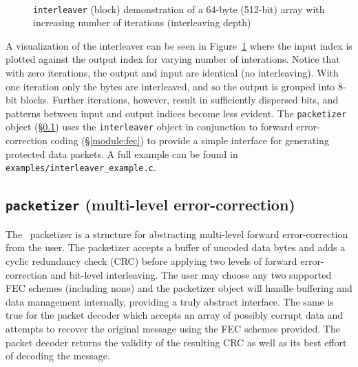 \begin{figure}
\centering
\mbox{
   \quad
   \quad
}
\mbox{
   \quad
   \quad
}
\mbox{
   \quad
}
\caption{{\tt interleaver} (block) demonstration of a 64-byte (512-bit) array
with increasing number of iterations (interleaving depth)}
\label{fig:module:framing:interleaver:scatterplot}
\end{figure}
%
A visualization of the interleaver can be seen in
Figure~\ref{fig:module:framing:interleaver:scatterplot}
where the input index is plotted against the output index for varying number
of interations.
Notice that with zero iterations, the output and input are identical (no
interleaving).
With one iteration only the bytes are interleaved, and so the output is
grouped into 8-bit blocks.
Further iterations, however, result in sufficiently dispersed bits, and
patterns between input and output indices become less evident.
%
The {\tt packetizer} object (\S\ref{module:framing:packetizer}) uses the
{\tt interleaver} object in conjunction to forward error-correction coding
(\S\ref{module:fec}) to provide a simple interface for generating
protected data packets.
A full example can be found in {\tt examples/interleaver\_example.c}.


%
%
\subsection{{\tt packetizer} (multi-level error-correction)}
\label{module:framing:packetizer}
The \liquid\ packetizer is a structure for abstracting multi-level forward
error-correction from the user.
The packetizer accepts a buffer of uncoded data bytes and adds a
cyclic redundancy check (CRC) before applying two levels of forward
error-correction and bit-level interleaving.
The user may choose any two supported FEC schemes (including none) and the
packetizer object will handle buffering and data management internally,
providing a truly abstract interface.
The same is true for the packet decoder which accepts an array
of possibly corrupt data and attempts to recover the original message using
the FEC schemes provided.
The packet decoder returns the validity of the resulting CRC as well as its
best effort of decoding the message.

